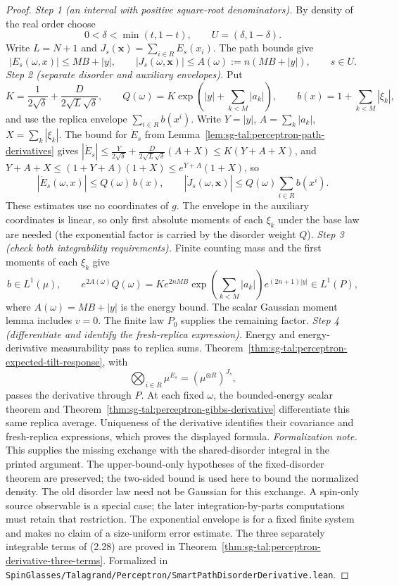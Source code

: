 \begin{proof}
  \leanok
\emph{Step 1 (an interval with positive square-root denominators).} By density of the real order choose
\[
 0<\delta<\min(t,1-t),\qquad U=(\delta,1-\delta).
\]
Write $L=N+1$ and $J_s(\mathbf x)=\sum_{i\in R}E_s(x_i)$. The path bounds give
\[
 |E_s(\omega,x)|\le MB+|y|,\qquad
 |J_s(\omega,\mathbf x)|\le A(\omega):=n(MB+|y|),\qquad s\in U.
\]
\emph{Step 2 (separate disorder and auxiliary envelopes).} Put
\[
 K=\frac1{2\sqrt\delta}+\frac{D}{2\sqrt L\sqrt\delta},\qquad
 Q(\omega)=K\exp\left(|y|+\sum_{k<M}|a_k|\right),\qquad
 b(x)=1+\sum_{k<M}|\xi_k|,
\]
and use the replica envelope $\sum_{i\in R}b(x^i)$. Write $Y=|y|$, $A=\sum_k|a_k|$, $X=\sum_k|\xi_k|$. The bound for $\dot E_s$ from
Lemma~\ref{lem:sg-tal:perceptron-path-derivatives} gives $|\dot E_s|\le\frac{Y}{2\sqrt\delta}+\frac{D}{2\sqrt L\sqrt\delta}(A+X)\le K(Y+A+X)$, and
$Y+A+X\le(1+Y+A)(1+X)\le e^{Y+A}(1+X)$, so
\[
 |\dot E_s(\omega,x)|\le Q(\omega)\,b(x),\qquad
 |\dot J_s(\omega,\mathbf x)|\le Q(\omega)\sum_{i\in R}b(x^i).
\]
These estimates use no coordinates of $g$. The envelope in the auxiliary coordinates is linear, so only first absolute moments of each $\xi_k$ under the
base law are needed (the exponential factor is carried by the disorder weight $Q$).
\emph{Step 3 (check both integrability requirements).} Finite counting mass and the first moments of each $\xi_k$ give
\[
 b\in L^1(\mu),\qquad
 e^{2A(\omega)}Q(\omega)
 =K e^{2nMB}\exp\left(\sum_{k<M}|a_k|\right)e^{(2n+1)|y|}\in L^1(P),
\]
where $A(\omega)=MB+|y|$ is the energy bound. The scalar Gaussian moment lemma includes $v=0$. The finite law $P_0$ supplies the remaining factor.
\emph{Step 4 (differentiate and identify the fresh-replica expression).} Energy and energy-derivative
measurability pass to replica sums. Theorem~\ref{thm:sg-tal:perceptron-expected-tilt-response}, with
\[
 \bigotimes_{i\in R}\mu^{E_s}=(\mu^{\otimes R})^{J_s},
\]
passes the derivative through $P$. At each fixed $\omega$, the bounded-energy scalar theorem and
Theorem~\ref{thm:sg-tal:perceptron-gibbs-derivative} differentiate this same replica average.
Uniqueness of the derivative identifies their covariance and fresh-replica expressions,
which proves the displayed formula.
\emph{Formalization note.} This supplies the missing exchange with the shared-disorder integral
in the printed argument. The upper-bound-only hypotheses of the fixed-disorder theorem are
preserved; the two-sided bound is used here to bound the normalized density. The old disorder
law need not be Gaussian for this exchange. A spin-only source observable is a special case;
the later integration-by-parts computations must retain that restriction. The exponential
envelope is for a fixed finite system and makes no claim of a size-uniform error estimate.
The three separately integrable terms of (2.28) are proved in
Theorem~\ref{thm:sg-tal:perceptron-derivative-three-terms}.
Formalized in \texttt{SpinGlasses/Talagrand/Perceptron/SmartPathDisorderDerivative.lean}.
\end{proof}

